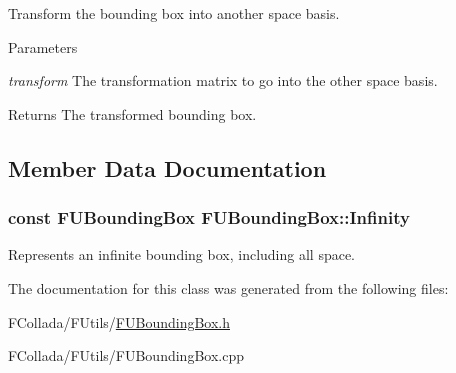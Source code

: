 \label{classFUBoundingBox_ad3ec61464fae8e3f896aa0086b259990}
Transform the bounding box into another space basis. 
\begin{DoxyParams}{Parameters}
\item[{\em transform}]The transformation matrix to go into the other space basis. \end{DoxyParams}
\begin{DoxyReturn}{Returns}
The transformed bounding box. 
\end{DoxyReturn}


\subsection{Member Data Documentation}
\hypertarget{classFUBoundingBox_a688baae52b9ddfab1fb0082da0bffe57}{
\subsubsection[{Infinity}]{\setlength{\rightskip}{0pt plus 5cm}const {\bf FUBoundingBox} {\bf FUBoundingBox::Infinity}}}
\label{classFUBoundingBox_a688baae52b9ddfab1fb0082da0bffe57}
Represents an infinite bounding box, including all space. 

The documentation for this class was generated from the following files:\begin{DoxyCompactItemize}
\item 
FCollada/FUtils/\hyperlink{FUBoundingBox_8h}{FUBoundingBox.h}\item 
FCollada/FUtils/FUBoundingBox.cpp\end{DoxyCompactItemize}

